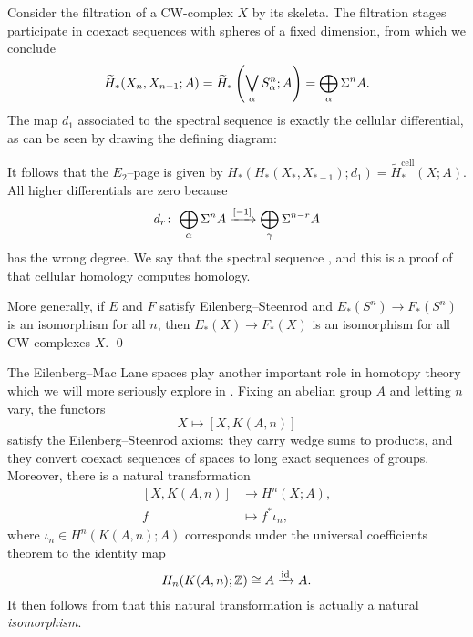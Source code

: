 \begin{example}\label{CellularHomologyWorks}
Consider the filtration of a CW-complex $X$ by its skeleta.
The filtration stages participate in coexact sequences with spheres of a fixed dimension, from which we conclude \[\widetilde H_*(X_n, X_{n-1}; A) = \widetilde H_*\left(\bigvee_\alpha S^n_\alpha ; A\right) = \bigoplus_\alpha \Sigma^n A.\]
The map $d_1$ associated to the spectral sequence is exactly the cellular differential, as can be seen by drawing the defining diagram:
\begin{center}
\end{center}
It follows that the $E_2$--page is given by $H_*(H_*(X_*, X_{*-1}); d_1) = \widetilde H_*^{\mathrm{cell}}(X; A)$.
All higher differentials are zero because \[d_r\colon\thinspace \bigoplus_\alpha \Sigma^n A \xrightarrow{[-1]} \bigoplus_\gamma \Sigma^{n-r} A\] has the wrong degree.
We say that the spectral sequence , and this is a proof of that cellular homology computes homology.
\end{example}

\begin{corollary}\label{SpheresDetectEquivalenceOfCohomologyTheories}
More generally, if $E$ and $F$ satisfy Eilenberg--Steenrod and $E_*(S^n) \to F_*(S^n)$ is an isomorphism for all $n$, then $E_*(X) \to F_*(X)$ is an isomorphism for all CW complexes $X$. \qed
\end{corollary}

\begin{example}\label{EMSpacesRepresentOrdinaryCoh}
The Eilenberg--Mac Lane spaces play another important role in homotopy theory which we will more seriously explore in .
Fixing an abelian group $A$ and letting $n$ vary, the functors \[X \mapsto [X, K(A, n)]\] satisfy the Eilenberg--Steenrod axioms: they carry wedge sums to products, and they convert coexact sequences of spaces to long exact sequences of groups.
Moreover, there is a natural transformation
\begin{align*}
{[X, K(A, n)]} & \to H^n(X; A), \\
f & \mapsto f^* \iota_n,
\end{align*}
where $\iota_n \in H^n(K(A, n); A)$ corresponds under the universal coefficients theorem to the identity map \[H_n(K(A, n); \mathbb Z) \cong A \xrightarrow{\operatorname{id}} A.\]
It then follows from  that this natural transformation is actually a natural \emph{isomorphism}.
\end{example}




